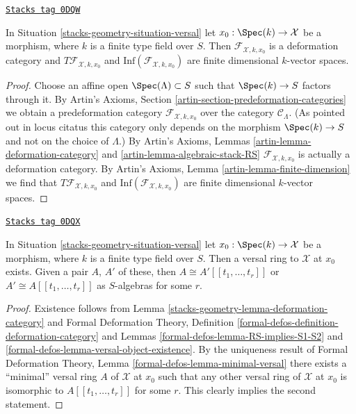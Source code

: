 \begin{lemma}
\label{stacks-geometry-lemma-deformation-category}
\href{https://stacks.math.columbia.edu/tag/0DQW}{\texttt{Stacks tag 0DQW}}

In Situation \ref{stacks-geometry-situation-versal} let $x_0 : \Spec(k) \to \mathcal{X}$
be a morphism, where $k$ is a finite type field over $S$.
Then $\mathcal{F}_{\mathcal{X}, k, x_0}$
is a deformation category and $T\mathcal{F}_{\mathcal{X}, k, x_0}$
and $\text{Inf}(\mathcal{F}_{\mathcal{X}, k, x_0})$
are finite dimensional $k$-vector spaces.
\end{lemma}

\begin{proof}
Choose an affine open $\Spec(\Lambda) \subset S$ such that
$\Spec(k) \to S$ factors through it.
By Artin's Axioms, Section \ref{artin-section-predeformation-categories}
we obtain a predeformation category
$\mathcal{F}_{\mathcal{X}, k, x_0}$
over the category $\mathcal{C}_\Lambda$.
(As pointed out in locus citatus this category only depends
on the morphism $\Spec(k) \to S$ and not on the choice of
$\Lambda$.) By Artin's Axioms, Lemmas
\ref{artin-lemma-deformation-category} and
\ref{artin-lemma-algebraic-stack-RS}
$\mathcal{F}_{\mathcal{X}, k, x_0}$ is actually a deformation category.
By Artin's Axioms, Lemma \ref{artin-lemma-finite-dimension}
we find that $T\mathcal{F}_{\mathcal{X}, k, x_0}$
and $\text{Inf}(\mathcal{F}_{\mathcal{X}, k, x_0})$
are finite dimensional $k$-vector spaces.
\end{proof}

\begin{lemma}
\label{stacks-geometry-lemma-versal-ring}
\href{https://stacks.math.columbia.edu/tag/0DQX}{\texttt{Stacks tag 0DQX}}

In Situation \ref{stacks-geometry-situation-versal} let $x_0 : \Spec(k) \to \mathcal{X}$
be a morphism, where $k$ is a finite type field over $S$.
Then a versal ring to $\mathcal{X}$ at $x_0$ exists. Given a pair
$A$, $A'$ of these, then $A \cong A'[[t_1, \ldots, t_r]]$
or $A' \cong A[[t_1, \ldots, t_r]]$ as $S$-algebras
for some $r$.
\end{lemma}

\begin{proof}
Existence follows from Lemma \ref{stacks-geometry-lemma-deformation-category} and
Formal Deformation Theory,
Definition \ref{formal-defos-definition-deformation-category} and
Lemmas \ref{formal-defos-lemma-RS-implies-S1-S2} and
\ref{formal-defos-lemma-versal-object-existence}.
By the uniqueness result of
Formal Deformation Theory, Lemma \ref{formal-defos-lemma-minimal-versal}
there exists a ``minimal'' versal ring $A$ of $\mathcal{X}$ at $x_0$
such that any other versal ring of $\mathcal{X}$ at $x_0$ is
isomorphic to $A[[t_1, \ldots, t_r]]$ for some $r$.
This clearly implies the second statement.
\end{proof}

